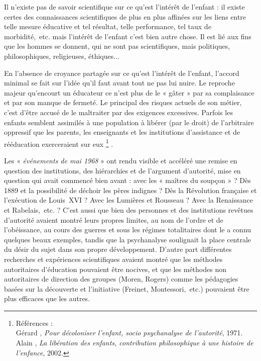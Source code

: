 \begin{table}[t]
\begin{table}[t]
 Il n'existe pas de savoir scientifique sur ce qu'est l'intérêt de l'enfant : il existe certes des connaissances scientifiques de plus en plus affinées sur les liens entre telle mesure éducative et tel résultat, telle performance, tel taux de morbidité,~etc. mais l'intérêt de l'enfant c'est bien autre chose. Il est lié aux fins que les hommes se donnent, qui ne sont pas scientifiques, mais politiques, philosophiques, religieuses, éthiques... 

 En l'absence de croyance partagée sur ce qu'est l'intérêt de l'enfant, l'accord minimal se fait sur l'idée qu'il faut avant tout ne pas lui nuire. Le reproche majeur qu'encourt un éducateur ce n'est plus de le « gâter » par sa complaisance et par son manque de fermeté. Le principal des risques actuels de son métier, c'est d'être accusé de le maltraiter par des exigences excessives. Parfois les enfants semblent assimilés à une population à libérer (par le droit) de l'arbitraire oppressif que les parents, les enseignants et les institutions d'assistance et de rééducation exerceraient sur eux%
\footnote{Références : 
\\Gérard , \emph{Pour décoloniser l'enfant, socio psychanalyse de l'autorité}, 1971.
\\Alain {}, \emph{La libération des enfants, contribution philosophique à une histoire de l'enfance}, 2002.}%
.

 Les « \emph{événements de mai 1968} » ont rendu visible et accéléré une remise en question des institutions, des hiérarchies et de l'argument d'autorité, mise en question qui avait commencé bien avant : avec les « maîtres du soupçon » ? Dès 1889 et la possibilité de déchoir les pères indignes ? Dès la Révolution française et l'exécution de Louis~XVI ? Avec les Lumières et Rousseau ? Avec la Renaissance et Rabelais,~etc. ? C'est aussi que bien des personnes et des institutions revêtues d'autorité avaient montré leurs propres limites, au nom de l'ordre et de l'obéissance, au cours des guerres et sous les régimes totalitaires dont le  a connu quelques beaux exemples, tandis que la psychanalyse soulignait la place centrale du désir du sujet dans son propre développement. D'autre part différentes recherches et expériences scientifiques avaient montré que les méthodes autoritaires d'éducation pouvaient être nocives, et que les méthodes non autoritaires de direction des groupes (Moren, Rogers) comme les pédagogies basées sur la découverte et l'initiative (Freinet, Montessori,~etc.) pouvaient être plus efficaces que les autres.


\end{table}
\end{table}
